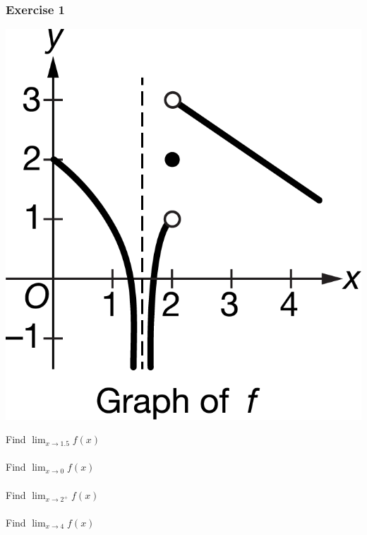 \documentclass[12pt]{beamer}
\begin{document}
\begin{frame}
	\frametitle{Exercise 1}
	\vspace*{\fill}
	\vspace*{\fill}
	\vspace*{\fill}
	\initclock
	\begin{minipage}{0.5\textwidth}
		\includegraphics[scale=0.8]{vasymp1}
	\end{minipage}%
	\begin{minipage}{0.5\textwidth}
		\Large
		Find $\displaystyle\lim_{x\to1.5}f(x)$\\
		\\
		Find $\displaystyle\lim_{x\to0}f(x)$\\
		\\
		Find $\displaystyle\lim_{x\to2^{+}}f(x)$\\
		\\
		Find $\displaystyle\lim_{x\to4}f(x)$\\
	\end{minipage}\\
	\vspace*{\fill}
	\vspace*{\fill}
	\crono
\end{frame}
\end{document}
